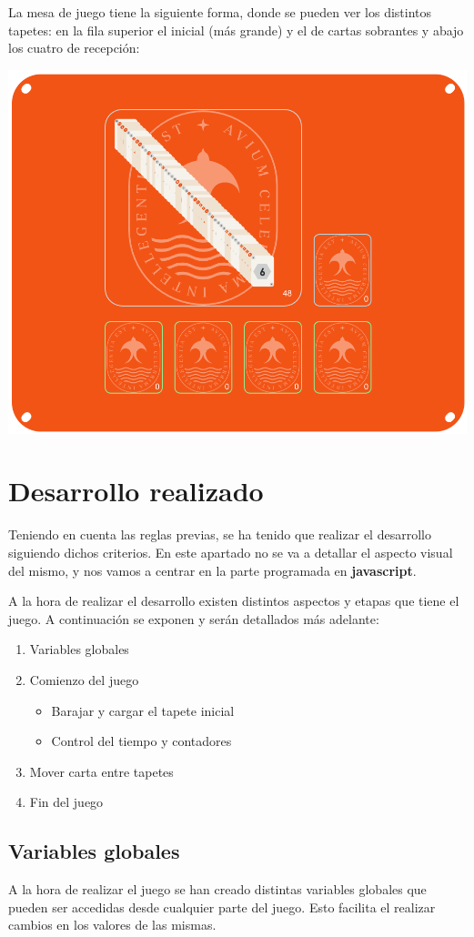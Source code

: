 \documentclass{\ClassPath/viu-tfm-template}
\begin{document}
La mesa de juego tiene la siguiente forma, donde se pueden ver los distintos tapetes: en la fila superior el inicial (más grande) y el de cartas sobrantes y abajo los cuatro de recepción:
\begin{center}
    \includegraphics[width=0.7\linewidth]{img/mesa.png}
\end{center}


\chapter{Desarrollo realizado}

Teniendo en cuenta las reglas previas, se ha tenido que realizar el desarrollo siguiendo dichos criterios. En este apartado no se va a detallar el aspecto visual del mismo, y nos vamos a centrar en la parte programada en \textbf{javascript}.

A la hora de realizar el desarrollo existen distintos aspectos y etapas que tiene el juego. A continuación se exponen y serán detallados más adelante:

\begin{enumerate}
    \item Variables globales
    \item Comienzo del juego
    \begin{itemize}
        \item Barajar y cargar el tapete inicial
        \item Control del tiempo y contadores
    \end{itemize}
    \item Mover carta entre tapetes
    \item Fin del juego
\end{enumerate}
\vspace{-1em}


\section{Variables globales}
A la hora de realizar el juego se han creado distintas variables globales que pueden ser accedidas desde cualquier parte del juego. Esto facilita el realizar cambios en los valores de las mismas.
\end{document}
